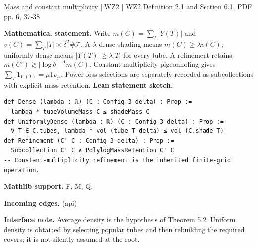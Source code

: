 \documentclass[10pt,a4paper]{article}
\newcommand{\nodecard}[1]{\hyperlink{node-#1}{\texttt{\detokenize{#1}}}}
\begin{document}
\begin{minipage}{\linewidth}
\hypertarget{node-Imass}{}
\begin{tcolorbox}[colback=white,colframe=apifg,colbacktitle=apibg,coltitle=ink,boxrule=0.45pt,arc=1.6mm,left=3mm,right=3mm,top=2mm,bottom=2mm,title={\sffamily\bfseries Refinement API \hfill \texttt{Imass}}]
{\sffamily\small\color{muted}Mass and constant multiplicity | WZ2 | WZ2 Definition 2.1 and Section 6.1, PDF pp. 6, 37-38}\par
\textbf{Mathematical statement.} Write $m(C)=\sum_T|Y(T)|$ and $v(C)=\sum_T|T|\asymp\delta^2\#\mathcal T$.
A $\lambda$-dense shading means $m(C)\ge\lambda v(C)$; uniformly dense means $|Y(T)|\ge\lambda|T|$ for every tube.
A refinement retains $m(C')\gtrsim |\log\delta|^{-A}m(C)$. Constant-multiplicity pigeonholing gives $\sum_T1_{Y'(T)}=\mu 1_{E_{C'}}$.
Power-loss selections are separately recorded as subcollections with explicit mass retention.
\smallskip\textbf{Lean statement sketch.}
\begin{Verbatim}[fontsize=\small,breaklines=true,breakanywhere=true,tabsize=2]
def Dense (lambda : ℝ) (C : Config 3 delta) : Prop :=
  lambda * tubeVolumeMass C ≤ shadeMass C
def UniformlyDense (lambda : ℝ) (C : Config 3 delta) : Prop :=
  ∀ T ∈ C.tubes, lambda * vol (tube T delta) ≤ vol (C.shade T)
def Refinement (C' C : Config 3 delta) : Prop :=
  Subcollection C' C ∧ PolylogMassRetention C' C
-- Constant-multiplicity refinement is the inherited finite-grid operation.
\end{Verbatim}
{\footnotesize\textbf{Mathlib support.} F, M, Q.\par
\textbf{Incoming edges.} \nodecard{Igeom} (api)\par}
{\footnotesize\textbf{Interface note.} Average density is the hypothesis of Theorem 5.2. Uniform density is obtained by selecting popular tubes and then rebuilding the required covers; it is not silently assumed at the root.}
\end{tcolorbox}\end{minipage}\par\medskip
\end{document}
